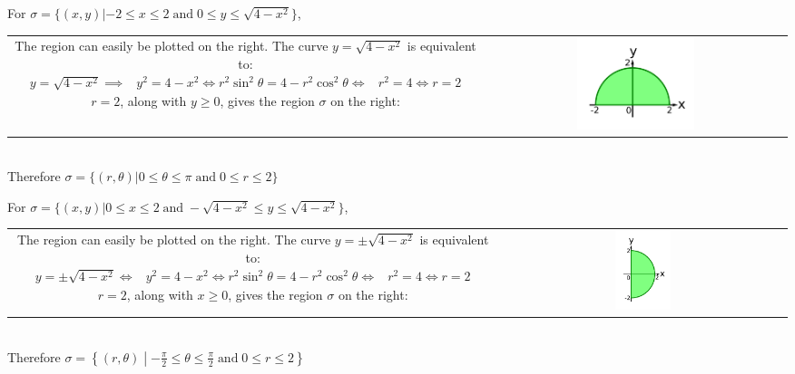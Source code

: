 \documentclass{article}
\newcommand{\dr}[1]{\textcolor{dark_red}{#1}}
\begin{document}
\dr{\begin{framed}
For \(\sigma = \{(x,y) | -2 \leq x \leq 2 \;\text{and}\; 0 \leq y \leq \sqrt{4 - x^2}\}\), \\
\begin{tabular}{cc}
\parbox{0.6\textwidth}{
The region can easily be plotted on the right. \\
The curve \(y = \sqrt{4 - x^2}\) is equivalent to:
\begin{align*}
y = \sqrt{4 - x^2} \implies & y^2 = 4 - x^2 
\iff r^2\sin^2\theta = 4 - r^2\cos^2\theta \\
\iff & r^2 = 4 
\iff r = 2 
\end{align*}
\(r = 2\), along with \(y \geq 0\), gives the region \(\sigma\) on the right:
} & \parbox{0.4\textwidth}{
\includegraphics[width = 0.4\textwidth]{Test_bench_part_3x_images/Test_bench_part_3x_Solutions_image_1}
} 
\end{tabular} \\
Therefore \(\sigma = \{(r,\theta) | 0 \leq \theta \leq \pi \;\text{and}\; 0 \leq r \leq 2\}\)
\end{framed}}


\dr{\begin{framed}
For \(\sigma = \{(x,y) | 0 \leq x \leq 2 \;\text{and}\; -\sqrt{4 - x^2} \leq y \leq \sqrt{4 - x^2}\}\), \\
\begin{tabular}{cc}
\parbox{0.6\textwidth}{
The region can easily be plotted on the right. \\
The curve \(y = \pm\sqrt{4 - x^2}\) is equivalent to: 
\begin{align*}
y = \pm\sqrt{4 - x^2} \iff & y^2 = 4 - x^2 
\iff r^2\sin^2\theta = 4 - r^2\cos^2\theta \\
\iff & r^2 = 4 
\iff r = 2
\end{align*}
\(r = 2\), along with \(x \geq 0\), gives the region \(\sigma\) on the right:
} & \parbox{0.2\textwidth}{
\includegraphics[width = 0.2\textwidth]{Test_bench_part_3x_images/Test_bench_part_3x_Solutions_image_2}
}
\end{tabular} \\
Therefore \(\sigma = \left\{(r,\theta) \middle| -\frac{\pi}{2} \leq \theta \leq \frac{\pi}{2} \;\text{and}\; 0 \leq r \leq 2\right\}\)
\end{framed}}
\end{document}
